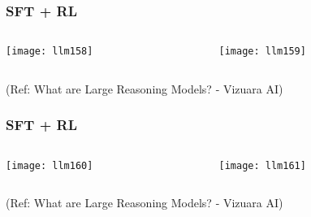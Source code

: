 \begin{frame}[fragile]\frametitle{SFT + RL}


\begin{columns}
    \begin{column}[T]{0.5\linewidth}
		\begin{center}
		\texttt{[image: llm158]}
		\end{center}

    \end{column}
    \begin{column}[T]{0.5\linewidth}
		\begin{center}
		\texttt{[image: llm159]}
		\end{center}
    \end{column}
  \end{columns}
  

{\tiny (Ref: What are Large Reasoning Models? - Vizuara AI)}

\end{frame}

\begin{frame}[fragile]\frametitle{SFT + RL}


\begin{columns}
    \begin{column}[T]{0.5\linewidth}
		\begin{center}
		\texttt{[image: llm160]}
		\end{center}

    \end{column}
    \begin{column}[T]{0.5\linewidth}
		\begin{center}
		\texttt{[image: llm161]}
		\end{center}
    \end{column}
  \end{columns}
  

{\tiny (Ref: What are Large Reasoning Models? - Vizuara AI)}

\end{frame}


